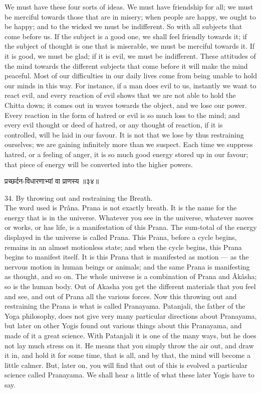 We must have these four sorts of ideas. We must have
friendship for all; we must be merciful towards those that are in
misery; when people are happy, we ought to be happy; and to the wicked
we must be indifferent. So with all subjects that come before us. If
the subject is a good one, we shall feel friendly towards it; if the
subject of thought is one that is miserable, we must be merciful
towards it. If it is good, we must be glad; if it is evil, we must be
indifferent. These attitudes of the mind towards the different subjects
that come before it will make the mind peaceful. Most of our
difficulties in our daily lives come from being unable to hold our
minds in this way. For instance, if a man does evil to us, instantly we
want to react evil, and every reaction of evil shows that we are not
able to hold the Chitta down; it comes out in waves towards the object,
and we lose our power. Every reaction in the form of hatred or evil is
so much loss to the mind; and
every evil thought or deed of hatred, or any thought of reaction, if it
is controlled, will be laid in our favour. It is not that we lose by
thus restraining ourselves; we are gaining infinitely more than we
suspect. Each time we suppress hatred, or a feeling of anger, it is so
much good energy stored up in our favour; that piece of energy will be
converted into the higher powers.\\

\begin{center}
\begin{sanskrit}
प्रच्छर्दन-विधारणाभ्यां वा प्राणस्य ॥३४॥
\end{sanskrit}
\end{center}
34. By throwing out and restraining the Breath. \\

The word used is Prâna. Prana is not exactly breath. It is the
name for the energy that is in the universe. Whatever you see in the
universe, whatever moves or works, or has life, is a manifestation of
this Prana. The sum-total of the energy displayed in the universe is
called Prana. This Prana, before a cycle begins, remains in an almost
motionless state; and when the cycle begins, this Prana begins to
manifest itself. It is this Prana that is manifested as motion — as the
nervous motion in human beings or animals; and the same Prana is
manifesting as thought, and so on. The whole universe is a combination
of Prana and Âkâsha; so is the human body. Out of Akasha you get the
different materials that you feel and see, and out of Prana all the
various forces. Now this throwing out and restraining the Prana is what
is called Pranayama. Patanjali, the father of the Yoga philosophy, does
not give very many particular directions about Pranayama, but later on
other Yogis found out various things about this Pranayama, and made of
it a great science. With Patanjali it is one of the many ways, but he
does not lay much stress on it. He means that you simply throw the air
out, and draw it in, and hold it for some time, that is all, and by
that, the mind will become a little calmer. But, later on, you will
find that out of this is evolved a particular science called Pranayama.
We shall hear a little of what these later Yogis have to say. \\

